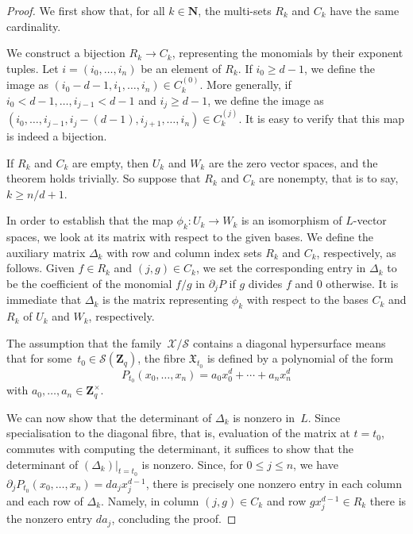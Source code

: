 \documentclass[a4paper,11pt]{article}
\numberwithin{equation}{section}
\newcommand{\NN}{\mathbf{N}} %
\newcommand{\ZZ}{\mathbf{Z}} %
\renewcommand{\to}{\rightarrow}        %
\theoremstyle{definition}
\begin{document}
\begin{proof}
We first show that, for all $k \in \NN$, the multi-sets $R_k$ and $C_k$ 
have the same cardinality.

We construct a bijection $R_k \to C_k$, representing the 
monomials by their exponent tuples.  Let $i = (i_0, \dotsc, i_n)$ be an
element of $R_k$.  If $i_0 \geq d-1$, we define the image as
$(i_0-d-1, i_1, \dotsc, i_n) \in C_k^{(0)}$.  More generally, if 
$i_0 < d-1, \dotsc, i_{j-1} < d-1$ and $i_j \geq d-1$, we define the image as 
$(i_0, \dotsc, i_{j-1}, i_j-(d-1), i_{j+1}, \dotsc, i_n) \in C_k^{(j)}$.  
It is easy to verify that this map is indeed a bijection.

If $R_k$ and $C_k$ are empty, then $U_k$ and $W_k$ are the zero vector spaces, and
the theorem holds trivially. So suppose that $R_k$ and $C_k$ are nonempty, that is to
say, $k \geq n/d + 1$.

In order to establish that the map $\phi_k \colon U_k \to W_k$ is an 
isomorphism of $L$-vector spaces, we look at its matrix with respect to 
the given bases.   We define the auxiliary matrix $\Delta_k$ with 
row and column index sets $R_k$ and $C_k$, respectively, as follows.  
Given $f \in R_k$ and $(j,g) \in C_k$, we set the corresponding entry in 
$\Delta_k$ to be the coefficient of the monomial $f/g$ in $\partial_j P$ if 
$g$ divides $f$ and $0$ otherwise. It is immediate that $\Delta_k$ is the 
matrix representing $\phi_k$ with respect to the bases $C_k$ and $R_k$ of 
$U_k$ and $W_k$, respectively.

The assumption that the family~$\mathcal{X}/\mathcal{S}$ contains a diagonal 
hypersurface means that for some~$t_0 \in \mathcal{S}(\ZZ_q)$, 
the fibre $\mathfrak{X}_{t_0}$ is defined by a polynomial of the form 
\begin{equation*}
P_{t_0}(x_0, \dotsc, x_n) = a_0 x_0^d + \dotsb + a_n x_n^d
\end{equation*}
with $a_0, \dotsc, a_n \in \ZZ_q^{\times}$.

We can now show that the determinant of $\Delta_k$ is nonzero in~$L$.  Since 
specialisation to the diagonal fibre, that is, evaluation of the matrix at 
$t = t_0$, commutes with computing the determinant, it suffices to show that 
the determinant of $(\Delta_k) \big |_{t=t_0}$ is nonzero.  Since, for 
$0 \leq j \leq n$, we have $\partial_j P_{t_0} (x_0, \dotsc, x_n) = d a_j x_j^{d-1}$, 
there is precisely one nonzero entry in each column and each row of $\Delta_k$.  
Namely, in column $(j, g) \in C_k$ and row $g x_j^{d-1} \in R_k$ there is the 
nonzero entry $d a_j$, concluding the proof.
\end{proof}
\end{document}
